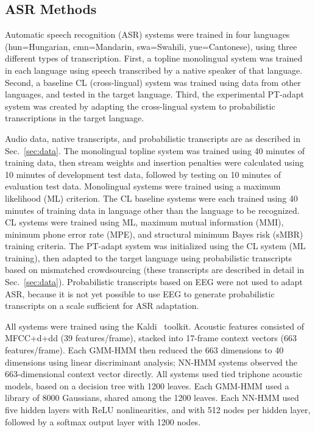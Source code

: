 \subsection{ASR Methods}
\label{sec:mlbaseline}

{\color{blue} Automatic speech recognition (ASR) systems were trained
  in four languages (hun=Hungarian, cmn=Mandarin, swa=Swahili,
  yue=Cantonese), using three different types of transcription.
  First, a topline {\sc monolingual} system was trained in each
  language using speech transcribed by a native speaker of that
  language.  Second, a baseline {\sc CL} (cross-lingual) system was
  trained using data from other languages, and tested in the target
  language.  Third, the experimental {\sc PT-adapt} system was created
  by adapting the cross-lingual system to probabilistic transcriptions
  in the target language.}

{\color{blue} Audio data, native transcripts, and probabilistic
  transcripts are as described in Sec.~\ref{sec:data}.  The {\sc
    monolingual} topline system was trained using 40 minutes of
  training data, then stream weights and insertion penalties were
  calculated using 10 minutes of development test data, followed by
  testing on 10 minutes of evaluation test data.  Monolingual systems
  were trained using a maximum likelihood (ML) criterion.  The {\sc
    CL} baseline systems were each trained using 40 minutes of
  training data in language other than the language to be recognized.
  CL systems were trained using ML, maximum mutual information (MMI),
  minimum phone error rate (MPE), and structural minimum Bayes risk
  (sMBR) training criteria.  The {\sc PT-adapt} system was initialized
  using the CL system (ML training), then adapted to the target
  language using probabilistic transcripts based on mismatched
  crowdsourcing (these transcripts are described in detail in
  Sec.~\ref{sec:data}).  Probabilistic transcripts based on EEG were
  not used to adapt ASR, because it is not yet possible to use EEG to
  generate probabilistic transcripts on a scale sufficient for ASR
  adaptation.}

{\color{blue} All systems were trained using the
  Kaldi~\cite{Kaldi2011} toolkit.  Acoustic features consisted of
  MFCC+d+dd (39 features/frame), stacked into 17-frame context vectors
  (663 features/frame).  Each GMM-HMM then reduced the
  663 dimensions to 40 dimensions using
  linear discriminant analysis; NN-HMM systems observed the
  663-dimensional context vector directly.  All systems used tied
  triphone acoustic models, based on a decision tree with 1200 leaves.
  Each GMM-HMM used a library of 8000 Gaussians, shared among the 1200
  leaves.  Each NN-HMM used five hidden layers with ReLU
  nonlinearities, and with 512 nodes per hidden layer, followed by a
  softmax output layer with 1200 nodes.}
  


